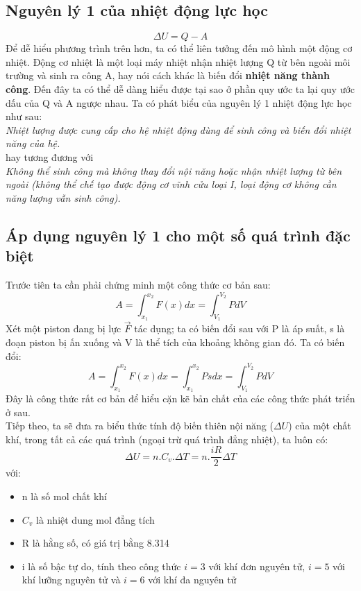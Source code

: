 \subsection{Nguyên lý 1 của nhiệt động lực học}
\begin{equation}
    \Delta U=Q-A
\end{equation}
Để dễ hiểu phương trình trên hơn, ta có thể liên tưởng đến mô hình một động cơ nhiệt. Động cơ nhiệt là một loại máy nhiệt nhận nhiệt lượng Q từ bên ngoài môi trường và sinh ra công A, hay nói cách khác là biến đổi \textbf{nhiệt năng thành công}. Đến đây ta có thể dễ dàng hiểu
được tại sao ở phần quy ước ta lại quy ước dấu của Q và A ngược nhau.
Ta có phát biểu của nguyên lý 1 nhiệt động lực học như sau:
\\ \textit{Nhiệt lượng được cung cấp cho hệ nhiệt động dùng để sinh công và biến đổi nhiệt năng của hệ.}
\\hay tương đương với 
\\ \textit{Không thể sinh công mà không thay đổi nội năng hoặc nhận nhiệt lượng từ bên ngoài (không thể chế tạo được động cơ vĩnh cửu loại I, loại động cơ không cần năng lượng vẫn sinh công).}
\subsection{Áp dụng nguyên lý 1 cho một số quá trình đặc biệt}
Trước tiên ta cần phải chứng minh một công thức cơ bản sau:
$$A=\int_{x_{1}}^{x_{2}}F(x)dx=\int_{V_{1}}^{V_{2}}PdV$$
Xét một piston đang bị lực $\vec{F}$ tác dụng; ta có biến đổi sau với P là áp suất, s là đoạn piston bị ấn xuống và V là thể tích của khoảng không gian đó. Ta có biến đổi:
$$A=\int_{x_{1}}^{x_{2}}F(x)dx=\int_{x_{1}}^{x_{2}}Psdx=\int_{V_{1}}^{V_{2}}PdV$$
Đây là công thức rất cơ bản để hiểu cặn kẽ bản chất của các công thức phát triển ở sau. \\Tiếp theo, ta sẽ đưa ra biểu thức tính độ biến thiên nội năng ($\Delta U$) của một chất khí, trong tất cả
các quá trình (ngoại trừ quá trình đẳng nhiệt), ta luôn có:
$$\Delta U=n.C_{v}.\Delta T=n.\frac{iR}{2}\Delta T$$
với:
\begin{itemize}
    \item n là số mol chất khí
    \item $C_{v}$ là nhiệt dung mol đẳng tích
    \item R là hằng số, có giá trị bằng 8.314
    \item i là số bậc tự do, tính theo công thức $i=3$ với khí đơn nguyên tử, $i=5$ với khí lưỡng nguyên tử và $i=6$ với khí đa nguyên tử
\end{itemize}
